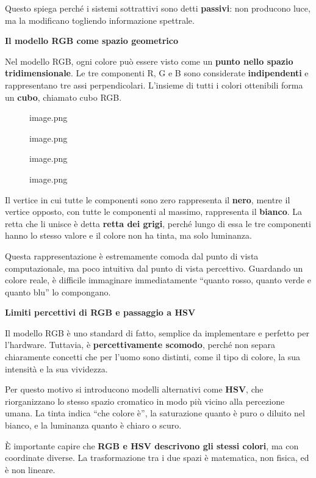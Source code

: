 \documentclass[
]{article}
\begin{document}
Questo spiega perché i sistemi sottrattivi sono detti \textbf{passivi}: non producono luce, ma la modificano togliendo informazione spettrale.

\textbf{Il modello RGB come spazio geometrico}

Nel modello RGB, ogni colore può essere visto come un \textbf{punto nello spazio tridimensionale}. Le tre componenti R, G e B sono considerate \textbf{indipendenti} e rappresentano tre assi perpendicolari. L'insieme di tutti i colori ottenibili forma un \textbf{cubo}, chiamato cubo RGB.

\begin{figure}
\centering
{image.png}
\caption{image.png}
\end{figure}

\begin{figure}
\centering
{image.png}
\caption{image.png}
\end{figure}

Il vertice in cui tutte le componenti sono zero rappresenta il \textbf{nero}, mentre il vertice opposto, con tutte le componenti al massimo, rappresenta il \textbf{bianco}. La retta che li unisce è detta \textbf{retta dei grigi}, perché lungo di essa le tre componenti hanno lo stesso valore e il colore non ha tinta, ma solo luminanza.

Questa rappresentazione è estremamente comoda dal punto di vista computazionale, ma poco intuitiva dal punto di vista percettivo. Guardando un colore reale, è difficile immaginare immediatamente ``quanto rosso, quanto verde e quanto blu'' lo compongano.

\textbf{Limiti percettivi di RGB e passaggio a HSV}

Il modello RGB è uno standard di fatto, semplice da implementare e perfetto per l'hardware. Tuttavia, è \textbf{percettivamente scomodo}, perché non separa chiaramente concetti che per l'uomo sono distinti, come il tipo di colore, la sua intensità e la sua vividezza.

Per questo motivo si introducono modelli alternativi come \textbf{HSV}, che riorganizzano lo stesso spazio cromatico in modo più vicino alla percezione umana. La tinta indica ``che colore è'', la saturazione quanto è puro o diluito nel bianco, e la luminanza quanto è chiaro o scuro.

È importante capire che \textbf{RGB e HSV descrivono gli stessi colori}, ma con coordinate diverse. La trasformazione tra i due spazi è matematica, non fisica, ed è non lineare.
\end{document}
